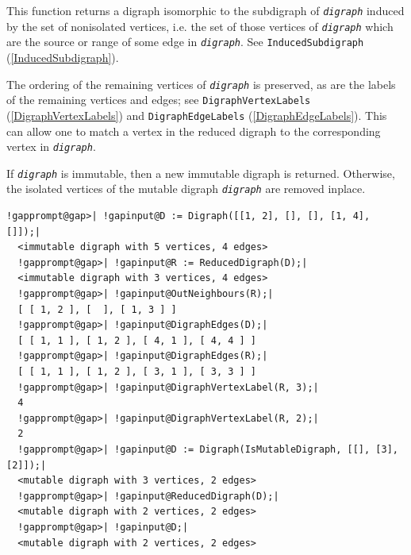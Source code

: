 \documentclass[a4paper,11pt]{report}
\begin{document}
{{{ This function returns a digraph isomorphic to the subdigraph of \mbox{\texttt{\mdseries\slshape digraph}} induced by the set of non\texttt{}isolated vertices, i.e. the set
of those vertices of \mbox{\texttt{\mdseries\slshape digraph}} which are the source or range of some edge in \mbox{\texttt{\mdseries\slshape digraph}}. See \texttt{InducedSubdigraph} (\ref{InducedSubdigraph}). 

 The ordering of the remaining vertices of \mbox{\texttt{\mdseries\slshape digraph}} is preserved, as are the labels of the remaining vertices and edges; see \texttt{DigraphVertexLabels} (\ref{DigraphVertexLabels}) and \texttt{DigraphEdgeLabels} (\ref{DigraphEdgeLabels}). This can allow one to match a vertex in the reduced digraph to the
corresponding vertex in \mbox{\texttt{\mdseries\slshape digraph}}. 

 If \mbox{\texttt{\mdseries\slshape digraph}} is immutable, then a new immutable digraph is returned. Otherwise, the
isolated vertices of the mutable digraph \mbox{\texttt{\mdseries\slshape digraph}} are removed in\texttt{}place. 
\begin{Verbatim}[commandchars=!@|,fontsize=\small,frame=single,label=Example]
  !gapprompt@gap>| !gapinput@D := Digraph([[1, 2], [], [], [1, 4], []]);|
  <immutable digraph with 5 vertices, 4 edges>
  !gapprompt@gap>| !gapinput@R := ReducedDigraph(D);|
  <immutable digraph with 3 vertices, 4 edges>
  !gapprompt@gap>| !gapinput@OutNeighbours(R);|
  [ [ 1, 2 ], [  ], [ 1, 3 ] ]
  !gapprompt@gap>| !gapinput@DigraphEdges(D);|
  [ [ 1, 1 ], [ 1, 2 ], [ 4, 1 ], [ 4, 4 ] ]
  !gapprompt@gap>| !gapinput@DigraphEdges(R);|
  [ [ 1, 1 ], [ 1, 2 ], [ 3, 1 ], [ 3, 3 ] ]
  !gapprompt@gap>| !gapinput@DigraphVertexLabel(R, 3);|
  4
  !gapprompt@gap>| !gapinput@DigraphVertexLabel(R, 2);|
  2
  !gapprompt@gap>| !gapinput@D := Digraph(IsMutableDigraph, [[], [3], [2]]);|
  <mutable digraph with 3 vertices, 2 edges>
  !gapprompt@gap>| !gapinput@ReducedDigraph(D);|
  <mutable digraph with 2 vertices, 2 edges>
  !gapprompt@gap>| !gapinput@D;|
  <mutable digraph with 2 vertices, 2 edges>
\end{Verbatim}
 }

 

}}
\end{document}
